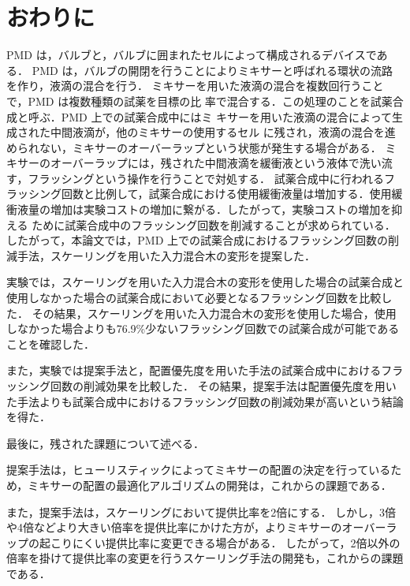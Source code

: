 \chapter{おわりに}
PMD は，バルブと，バルブに囲まれたセルによって構成されるデバイスである．
PMD は，バルブの開閉を行うことによりミキサーと呼ばれる環状の流路を作り，液滴の混合を行う．
ミキサーを用いた液滴の混合を複数回行うことで，PMD は複数種類の試薬を目標の比
率で混合する．この処理のことを試薬合成と呼ぶ．PMD 上での試薬合成中にはミ
キサーを用いた液滴の混合によって生成された中間液滴が，他のミキサーの使用するセル
に残され，液滴の混合を進められない，ミキサーのオーバーラップという状態が発生する場合がある．
ミキサーのオーバーラップには，残された中間液滴を緩衝液という液体で洗い流す，フラッシングという操作を行うことで対処する．
試薬合成中に行われるフラッシング回数と比例して，試薬合成における使用緩衝液量は増加する．使用緩衝液量の増加は実験コストの増加に繋がる．したがって，実験コストの増加を抑える
ために試薬合成中のフラッシング回数を削減することが求められている．
したがって，本論文では，PMD 上での試薬合成におけるフラッシング回数の削減手法，スケーリングを用いた入力混合木の変形を提案した．

実験では，スケーリングを用いた入力混合木の変形を使用した場合の試薬合成と使用しなかった場合の試薬合成において必要となるフラッシング回数を比較した．
その結果，スケーリングを用いた入力混合木の変形を使用した場合，使用しなかった場合よりも76.9\%少ないフラッシング回数での試薬合成が可能であることを確認した．

また，実験では提案手法と，配置優先度を用いた手法の試薬合成中におけるフラッシング回数の削減効果を比較した．
その結果，提案手法は配置優先度を用いた手法よりも試薬合成中におけるフラッシング回数の削減効果が高いという結論を得た．

最後に，残された課題について述べる．

提案手法は，ヒューリスティックによってミキサーの配置の決定を行っているため，ミキサーの配置の最適化アルゴリズムの開発は，これからの課題である．

また，提案手法は，スケーリングにおいて提供比率を2倍にする．
しかし，3倍や4倍などより大きい倍率を提供比率にかけた方が，よりミキサーのオーバーラップの起こりにくい提供比率に変更できる場合がある．
したがって，2倍以外の倍率を掛けて提供比率の変更を行うスケーリング手法の開発も，これからの課題である．

%

